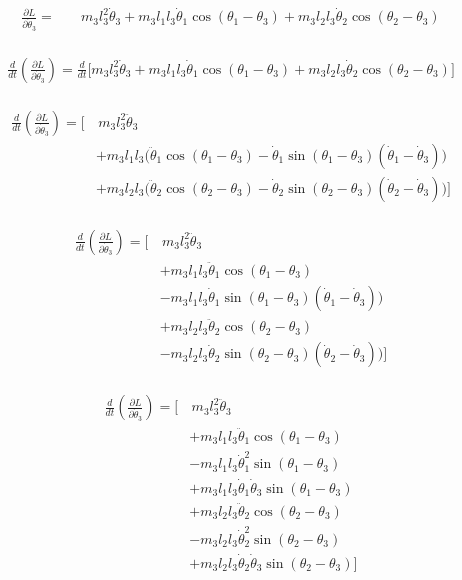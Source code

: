 \documentclass[11pt,a4paper]{article}
\begin{document}
\begin{align*}
    \frac{\partial L}{\partial \dot\theta_3} =
    &\quad m_3  l_3^2 \dot{\theta}_3 + m_3 l_1 l_3 \dot{\theta}_1 \cos(\theta_1 - \theta_3) + m_3 l_2 l_3 \dot{\theta}_2 \cos(\theta_2 - \theta_3) \\
\end{align*}

\begin{align*}
    \frac{d}{dt} \left( \frac{\partial L}{\partial \dot{\theta}_3} \right) = \frac{d}{dt} \biggl[
    m_3  l_3^2 \dot{\theta}_3 + m_3 l_1 l_3 \dot{\theta}_1 \cos(\theta_1 - \theta_3) + m_3 l_2 l_3 \dot{\theta}_2 \cos(\theta_2 - \theta_3) \biggr] \\
\end{align*}

\begin{align*}
    \frac{d}{dt} \left( \frac{\partial L}{\partial \dot{\theta}_3} \right) = \biggl[
    & \, m_3  l_3^2 \ddot{\theta}_3 \\
    &+ m_3 l_1 l_3 \big( \ddot{\theta}_1 \cos(\theta_1 - \theta_3) - \dot{\theta}_1 \sin(\theta_1 - \theta_3)(\dot{\theta}_1 - \dot{\theta}_3) \big) \\
    &+ m_3 l_2 l_3 \big( \ddot{\theta}_2 \cos(\theta_2 - \theta_3) - \dot{\theta}_2 \sin(\theta_2 - \theta_3)(\dot{\theta}_2 - \dot{\theta}_3) \big)\biggr] \\
\end{align*}

\begin{align*}
    \frac{d}{dt} \left( \frac{\partial L}{\partial \dot{\theta}_3} \right) = \biggl[
    & \, m_3  l_3^2 \ddot{\theta}_3 \\
    &+ m_3 l_1 l_3 \ddot{\theta}_1 \cos(\theta_1 - \theta_3) \\
    &- m_3 l_1 l_3 \dot{\theta}_1 \sin(\theta_1 - \theta_3)(\dot{\theta}_1 - \dot{\theta}_3) \big) \\
    &+ m_3 l_2 l_3 \ddot{\theta}_2 \cos(\theta_2 - \theta_3) \\
    &- m_3 l_2 l_3 \dot{\theta}_2 \sin(\theta_2 - \theta_3)(\dot{\theta}_2 - \dot{\theta}_3) \big)\biggr] \\
\end{align*}

\begin{align*}
    \frac{d}{dt} \left( \frac{\partial L}{\partial \dot{\theta}_3} \right) = \biggl[
    & \, m_3  l_3^2 \ddot{\theta}_3 \\
    &+ m_3 l_1 l_3 \ddot{\theta}_1 \cos(\theta_1 - \theta_3) \\
    &- m_3 l_1 l_3 \dot{\theta}_1^2 \sin(\theta_1 - \theta_3) \\
    &+ m_3 l_1 l_3 \dot{\theta}_1 \dot{\theta}_3 \sin(\theta_1 - \theta_3) \\
    &+ m_3 l_2 l_3 \ddot{\theta}_2 \cos(\theta_2 - \theta_3) \\
    &- m_3 l_2 l_3 \dot{\theta}_2^2 \sin(\theta_2 - \theta_3) \\
    &+ m_3 l_2 l_3 \dot{\theta}_2 \dot{\theta}_3 \sin(\theta_2 - \theta_3) \biggr] \\
\end{align*}
\end{document}
